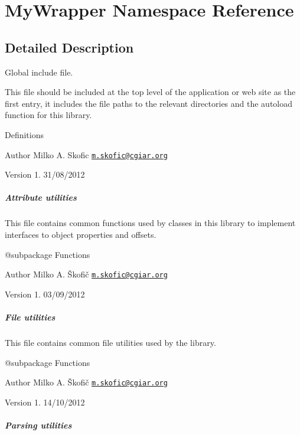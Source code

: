 \hypertarget{namespace_my_wrapper}{\section{My\-Wrapper Namespace Reference}
\label{namespace_my_wrapper}
}


\subsection{Detailed Description}
Global include file.

This file should be included at the top level of the application or web site as the first entry, it includes the file paths to the relevant directories and the autoload function for this library.

Definitions

\begin{DoxyAuthor}{Author}
Milko A. Skofic \href{mailto:m.skofic@cgiar.org}{\tt m.\-skofic@cgiar.\-org} 
\end{DoxyAuthor}
\begin{DoxyVersion}{Version}
1. 31/08/2012
\end{DoxyVersion}
\subparagraph*{Attribute utilities}

This file contains common functions used by classes in this library to implement interfaces to object properties and offsets.

\begin{DoxyVerb} @subpackage        Functions
\end{DoxyVerb}


\begin{DoxyAuthor}{Author}
Milko A. Škofič \href{mailto:m.skofic@cgiar.org}{\tt m.\-skofic@cgiar.\-org} 
\end{DoxyAuthor}
\begin{DoxyVersion}{Version}
1. 03/09/2012
\end{DoxyVersion}
\subparagraph*{File utilities}

This file contains common file utilities used by the library.

\begin{DoxyVerb} @subpackage        Functions
\end{DoxyVerb}


\begin{DoxyAuthor}{Author}
Milko A. Škofič \href{mailto:m.skofic@cgiar.org}{\tt m.\-skofic@cgiar.\-org} 
\end{DoxyAuthor}
\begin{DoxyVersion}{Version}
1. 14/10/2012
\end{DoxyVersion}
\subparagraph*{Parsing utilities}

